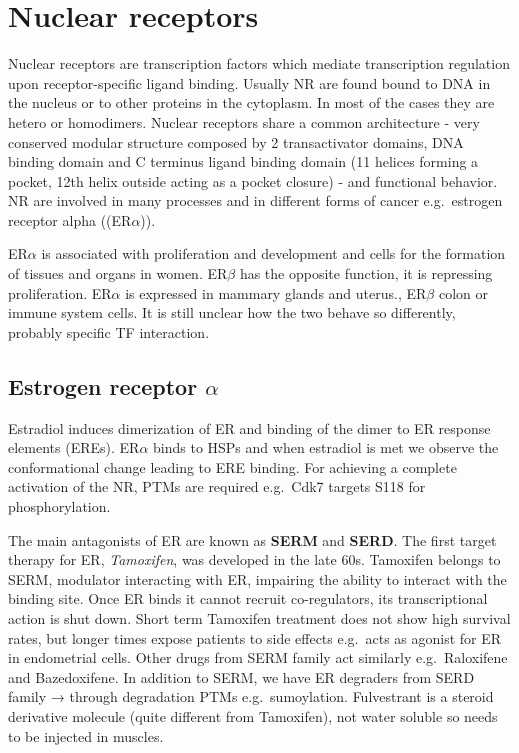 \hypertarget{nuclear-receptors}{%
\section{Nuclear receptors}\label{nuclear-receptors}}

Nuclear receptors are transcription factors which mediate transcription regulation upon receptor-specific ligand binding. Usually NR are found bound to DNA in the nucleus or to other proteins in the cytoplasm. In most of the cases they are hetero or homodimers. Nuclear receptors share a common architecture - very conserved modular structure composed by 2 transactivator domains, DNA binding domain and C terminus ligand binding domain (11 helices forming a pocket, 12th helix outside acting as a pocket closure) - and functional behavior. NR are involved in many processes and in different forms of cancer e.g.~estrogen receptor alpha ((ER$\alpha$)).

ER$\alpha$ is associated with proliferation and development and cells for the formation of tissues and organs in women. ER$\beta$ has the opposite function, it is repressing proliferation. ER$\alpha$ is expressed in mammary glands and uterus., ER$\beta$ colon or immune system cells. It is still unclear how the two behave so differently, probably specific TF interaction.

\hypertarget{estrogen-receptor-alpha}{%
\subsection{\texorpdfstring{Estrogen receptor \(\alpha\)}{Estrogen receptor \textbackslash alpha}}\label{estrogen-receptor-alpha}}

Estradiol induces dimerization of ER and binding of the dimer to ER response elements (EREs). ER$\alpha$ binds to HSPs and when estradiol is met we observe the conformational change leading to ERE binding. For achieving a complete activation of the NR, PTMs are required e.g.~Cdk7 targets S118 for phosphorylation.

The main antagonists of ER are known as \textbf{SERM} and \textbf{SERD}. The first target therapy for ER, \emph{Tamoxifen}, was developed in the late 60s. Tamoxifen belongs to SERM, modulator interacting with ER, impairing the ability to interact with the binding site. Once ER binds it cannot recruit co-regulators, its transcriptional action is shut down. Short term Tamoxifen treatment does not show high survival rates, but longer times expose patients to side effects e.g.~acts as agonist for ER in endometrial cells. Other drugs from SERM family act similarly e.g.~Raloxifene and Bazedoxifene. In addition to SERM, we have ER degraders from SERD family → through degradation PTMs e.g.~sumoylation. Fulvestrant is a steroid derivative molecule (quite different from Tamoxifen), not water soluble so needs to be injected in muscles.

